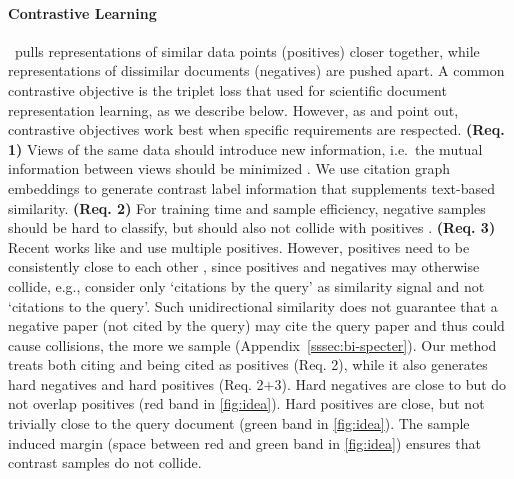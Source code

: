 \documentclass[11pt]{article}
\begin{document}
\paragraph{Contrastive Learning}\ pulls representations of similar data points (positives) closer together, while representations of dissimilar documents (negatives) are pushed apart.
A common contrastive objective is the triplet loss \cite{TripletLossORG} that \citet{Cohan2020} used for scientific document representation learning, as we describe below. 
However, as \citet{MetricLearningReality} and \citet{Rethmeier2021} point out, contrastive objectives work best when specific requirements are respected. 
\textbf{(Req. 1)} Views of the same data should introduce new information, i.e.\ the mutual information between views should be minimized \cite{MI_views}. We use citation graph embeddings to generate contrast label information that supplements text-based similarity. \textbf{(Req. 2)} For training time and sample efficiency, negative samples should be hard to classify, but should also not collide with positives \cite{ContrastiveLearningLimitations}.   
\textbf{(Req. 3)} Recent works like \citet{MetricLearningReality} and \citet{muliplePositiveCTL1} use multiple positives. However, positives need to be consistently close to each other \cite{PositivesSimilarImportant}, since positives and negatives may otherwise collide, e.g., \citet{Cohan2020} consider only `citations by the query' as similarity signal and not `citations to the query'.
Such unidirectional similarity does not guarantee that a negative paper (not cited by the query) may cite the query paper and thus could cause collisions, the more we sample (Appendix~\ref{sssec:bi-specter}).
Our method treats both citing and being cited as positives (Req. 2), while it also generates hard negatives and hard positives (Req. 2+3). Hard negatives are close to but do not overlap positives (red band in \cref{fig:idea}). Hard positives are close, but not trivially close to the query document (green band in \cref{fig:idea}).
The sample induced margin (space between red and green band in \cref{fig:idea}) ensures that contrast samples do not collide.
\end{document}
